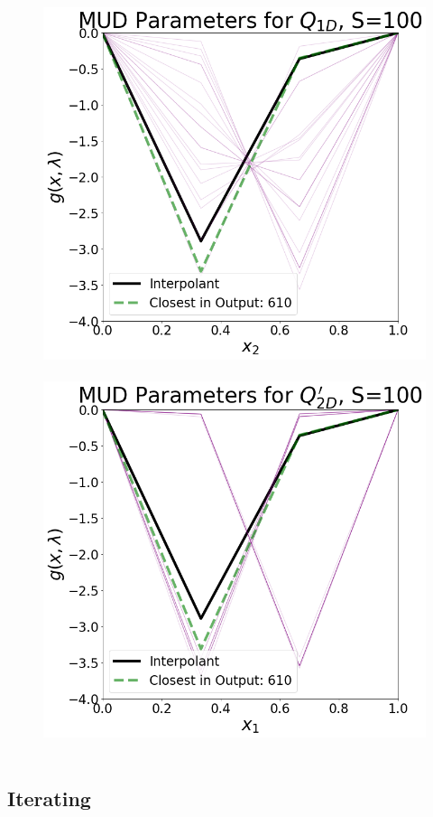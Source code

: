 \begin{frame}

\begin{figure}
\hbox{
  \includegraphics[width=0.5\linewidth]{figures/pde-highd/pde-highd_pair_D2-1_m100.png}
  \includegraphics[width=0.5\linewidth]{figures/pde-highd/pde-highd_pair_bad_D2-2_m100.png}
}
\label{fig:pde-highd-2d-scalar-vs-alt}
\end{figure}

\end{frame}


\subsection{Iterating}


